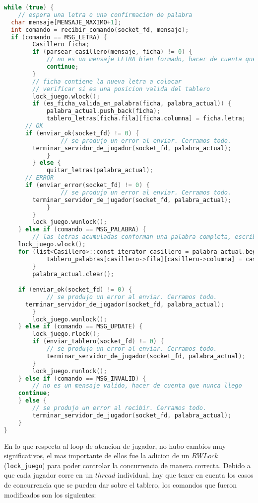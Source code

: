 \begin{lstlisting}[language=C++, breaklines=true]
while (true) {
	// espera una letra o una confirmacion de palabra
  char mensaje[MENSAJE_MAXIMO+1];
  int comando = recibir_comando(socket_fd, mensaje);
  if (comando == MSG_LETRA) {
		Casillero ficha;
		if (parsear_casillero(mensaje, ficha) != 0) {
			// no es un mensaje LETRA bien formado, hacer de cuenta que nunca llego
			continue;
		}
		// ficha contiene la nueva letra a colocar
		// verificar si es una posicion valida del tablero
		lock_juego.wlock();
		if (es_ficha_valida_en_palabra(ficha, palabra_actual)) {
			palabra_actual.push_back(ficha);
			tablero_letras[ficha.fila][ficha.columna] = ficha.letra;
      // OK
      if (enviar_ok(socket_fd) != 0) {
				// se produjo un error al enviar. Cerramos todo.
        terminar_servidor_de_jugador(socket_fd, palabra_actual);
			}
		} else {
			quitar_letras(palabra_actual);
      // ERROR
      if (enviar_error(socket_fd) != 0) {
				// se produjo un error al enviar. Cerramos todo.
        terminar_servidor_de_jugador(socket_fd, palabra_actual);
			}
		}
		lock_juego.wunlock();
	} else if (comando == MSG_PALABRA) {
		// las letras acumuladas conforman una palabra completa, escribirlas en el tablero de palabras y borrar las letras temporales
    lock_juego.wlock();
    for (list<Casillero>::const_iterator casillero = palabra_actual.begin(); casillero != palabra_actual.end(); casillero++) {
			tablero_palabras[casillero->fila][casillero->columna] = casillero->letra;
		}
		palabra_actual.clear();

    if (enviar_ok(socket_fd) != 0) {
			// se produjo un error al enviar. Cerramos todo.
      terminar_servidor_de_jugador(socket_fd, palabra_actual);
		}
		lock_juego.wunlock();
	} else if (comando == MSG_UPDATE) {
		lock_juego.rlock();
		if (enviar_tablero(socket_fd) != 0) {
			// se produjo un error al enviar. Cerramos todo.
			terminar_servidor_de_jugador(socket_fd, palabra_actual);
		}
		lock_juego.runlock();
	} else if (comando == MSG_INVALID) {
		// no es un mensaje valido, hacer de cuenta que nunca llego
    continue;
	} else {
		// se produjo un error al recibir. Cerramos todo.
		terminar_servidor_de_jugador(socket_fd, palabra_actual);
	}
}
\end{lstlisting}

En lo que respecta al loop de atencion de jugador, no hubo cambios muy significativos, el mas importante de ellos fue la adicion de un $RWLock$ (\texttt{lock\_juego}) para poder controlar la concurrencia de manera correcta. Debido a que cada jugador corre en un $thread$ individual, hay que tener en cuenta los casos de concurrencia que se pueden dar sobre el tablero, los comandos que fueron modificados son los siguientes:

